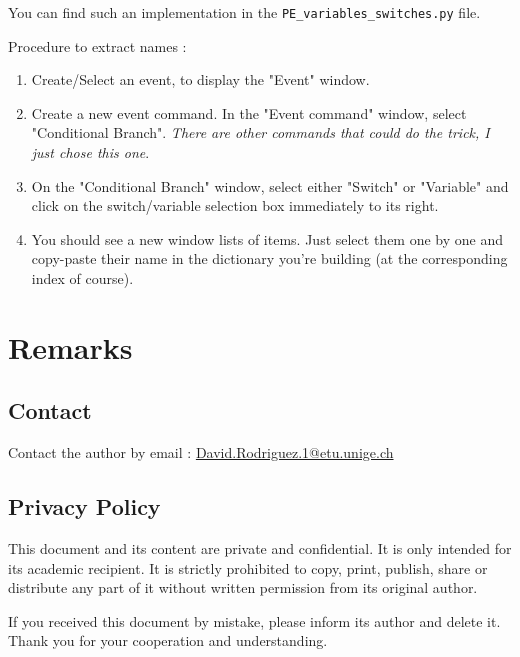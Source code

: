 \documentclass[11pt]{article}
\begin{document}
You can find such an implementation in the \verb|PE_variables_switches.py| file.

Procedure to extract names :
\begin{enumerate}
	\item Create/Select an event, to display the "Event" window.
	
	\item Create a new event command. In the "Event command" window, select "Conditional Branch". \textit{There are other commands that could do the trick, I just chose this one}.
	
	\item On the "Conditional Branch" window, select either "Switch" or "Variable" and click on the switch/variable selection box immediately to its right.
	
	\item You should see a new window lists of items. Just select them one by one and copy-paste their name in the dictionary you're building (at the corresponding index of course).
\end{enumerate}



\newpage
\section{Remarks}

\subsection{Contact}

Contact the author by email : \href{mailto:David.Rodriguez.1@etu.unige.ch}{David.Rodriguez.1@etu.unige.ch}

\subsection{Privacy Policy}
\label{sec:privacypolice}

This document and its content are private and confidential. It is only intended for its academic recipient. It is strictly prohibited to copy, print, publish, share or distribute any part of it without written permission from its original author.

If you received this document by mistake, please inform its author and delete it. Thank you for your cooperation and understanding.
\end{document}
